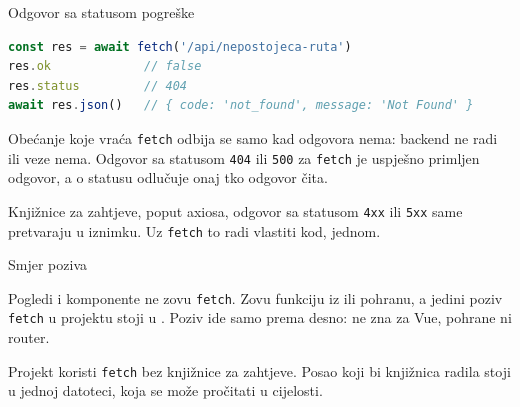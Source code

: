 \begin{frame}[fragile]{Odgovor sa statusom pogreške}
\begin{lstlisting}[language=typescript]
const res = await fetch('/api/nepostojeca-ruta')
res.ok             // false
res.status         // 404
await res.json()   // { code: 'not_found', message: 'Not Found' }
\end{lstlisting}

\vspace{0.5em}
Obećanje koje vraća \texttt{fetch} odbija se samo kad odgovora nema: backend ne radi ili veze nema. Odgovor sa statusom \texttt{404} ili \texttt{500} za \texttt{fetch} je uspješno primljen odgovor, a o statusu odlučuje onaj tko odgovor čita.

\vspace{0.5em}
Knjižnice za zahtjeve, poput axiosa, odgovor sa statusom \texttt{4xx} ili \texttt{5xx} same pretvaraju u iznimku. Uz \texttt{fetch} to radi vlastiti kod, jednom.
\end{frame}

\begin{frame}{Smjer poziva}
\begin{center}
\end{center}

\vspace{0.5em}
Pogledi i komponente ne zovu \texttt{fetch}. Zovu funkciju iz  ili pohranu, a jedini poziv \texttt{fetch} u projektu stoji u . Poziv ide samo prema desno:  ne zna za Vue, pohrane ni router.

\vspace{0.4em}
\begin{konvencija}
Projekt koristi \texttt{fetch} bez knjižnice za zahtjeve. Posao koji bi knjižnica radila stoji u jednoj datoteci, koja se može pročitati u cijelosti.
\end{konvencija}
\end{frame}

